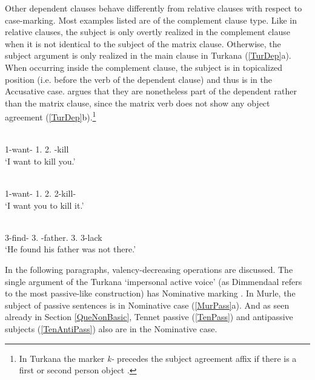 Other dependent clauses behave differently from relative clauses with respect to case-marking. 
Most examples listed are of the complement clause type.
Like in relative clauses, the subject is only overtly realized in the complement clause when it is not identical to the subject of the matrix clause. 
Otherwise, the subject argument is only realized in the main clause in Turkana (\ref{TurDep}a).   
When occurring inside the complement clause, the subject is in topicalized position (i.e. before the verb of the dependent clause) and thus is in the Accusative case.  
\citet[374]{Dimmendaal:1982} argues that they are nonetheless part of the dependent rather than the matrix clause, since the matrix verb does not show any object agreement (\ref{TurDep}b).\footnote{In Turkana the marker \emph{k-} precedes the subject agreement affix if there is a first or second person object \citep[122]{Dimmendaal:1982}.}  

\begin{exe}\ex\label{TurDep}
\begin{xlist}
\ex\gll {} \textbf{}  \\
1\sg{}-want-\asp{} 1\sg{}.\nom{} 2\sg{}.\acc{} \Inf{}-kill\\
\glt `I want to kill you.'
 
\ex\gll {}  \textbf{} \\
1\sg{}-want-\asp{} 1\sg{}.\nom{} 2\sg{}.\acc{} 2\sg{}-kill-\asp{}\\
\glt `I want you to kill it.'

\ex\gll{}  \textbf{}  \\
3-find-\ventiv{} 3\sg{}.\nom{} \NC{}-father.\acc{} 3\sg{}.\poss{} 3-lack\\
\glt `He found his father was not there.'
\end{xlist}
\end{exe}

In the following paragraphs, valency-decreasing operations are discussed.
The single argument of the {Turkana} `impersonal active voice' (as Dimmendaal refers to the most passive-like construction) has Nominative  marking \citep[132--133]{Dimmendaal:1982}. 
In Murle, the subject of passive sentences is in Nominative  case (\ref{MurPass}a).
And as seen already in Section \ref{QueNonBasic}, Tennet passive (\ref{TenPass}) and antipassive subjects (\ref{TenAntiPass}) also are in the Nominative  case. 

